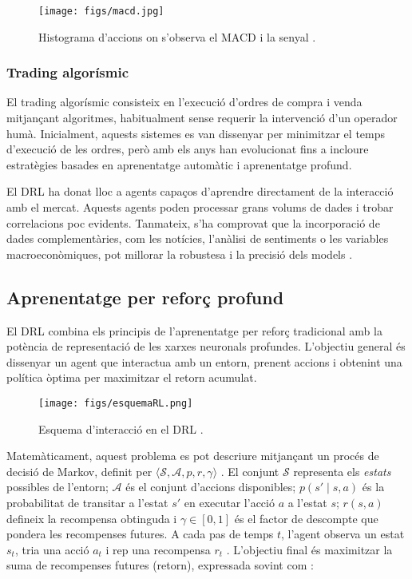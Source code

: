 \documentclass[12pt,a4paper,twoside]{book}
\begin{document}
\begin{figure}[H]
	\centering
	\texttt{[image: figs/macd.jpg]}
	\caption{Histograma d'accions on s'observa el MACD i la senyal \cite{InvestopediaMACD}.}
	\label{fig:context-anoni1}
\end{figure}

\subsubsection{Trading algorísmic}
El trading algorísmic consisteix en l'execució d'ordres de compra i venda mitjançant algoritmes, habitualment sense requerir la intervenció d'un operador humà. Inicialment, aquests sistemes es van dissenyar per minimitzar el temps d'execució de les ordres, però amb els anys han evolucionat fins a incloure estratègies  basades en aprenentatge automàtic i aprenentatge profund\cite{Origins}.

El DRL ha donat lloc a agents capaços d'aprendre directament de la interacció amb el mercat. Aquests agents poden processar grans volums de dades i trobar correlacions poc evidents. Tanmateix, s'ha comprovat que la incorporació de dades complementàries, com les notícies, l'anàlisi de sentiments o les variables macroeconòmiques, pot millorar la robustesa i la precisió dels models \cite{DBLP}.



\subsection{Aprenentatge per reforç profund}

El DRL combina els principis de l'aprenentatge per reforç tradicional amb la potència de representació de les xarxes neuronals profundes. L'objectiu general és dissenyar un agent que interactua amb un entorn, prenent accions i obtenint una política òptima per maximitzar el retorn acumulat.


\begin{figure}[H]
	\centering
	\texttt{[image: figs/esquemaRL.png]}
	\caption{Esquema d'interacció en el DRL \cite{esquemaRL}.}
	\label{fig:context-anoni1}
\end{figure}


Matemàticament, aquest problema es pot descriure mitjançant un procés de decisió de Markov, definit per $\langle \mathcal{S}, \mathcal{A}, p, r, \gamma\rangle$ \cite{DRLIntro}. El conjunt $\mathcal{S}$ representa els \emph{estats} possibles de l'entorn; $\mathcal{A}$ és el conjunt d'accions disponibles; $p(s' \mid s,a)$ és la probabilitat de transitar a l'estat $s'$ en executar l'acció $a$ a l'estat $s$; $r(s,a)$ defineix la recompensa obtinguda i $\gamma \in [0,1]$ és el factor de descompte que pondera les recompenses futures. A cada pas de temps $t$, l'agent observa un estat $s_t$, tria una acció $a_t$ i rep una recompensa $r_t$ \cite{RLIntro}. L'objectiu final és maximitzar la suma de recompenses futures (retorn), expressada sovint com :
\end{document}
